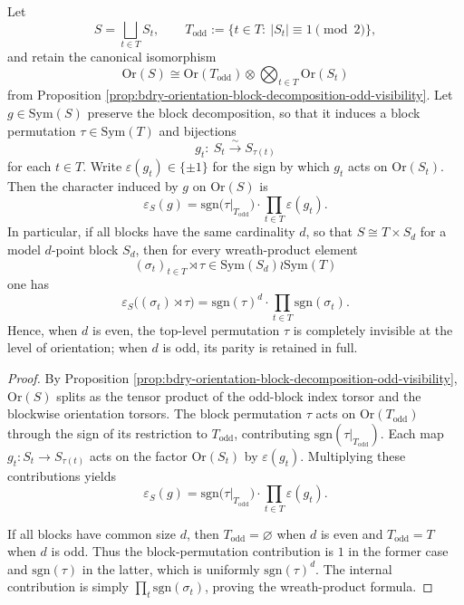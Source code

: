 \begin{theorem}\label{thm:bdry-orientation-wreath-character-odd-visibility}
Let
\[
S=\bigsqcup_{t\in T}S_t,
\qquad
T_{\mathrm{odd}}:=\{t\in T:\ |S_t|\equiv 1\pmod 2\},
\]
and retain the canonical isomorphism
\[
\mathrm{Or}(S)\cong \mathrm{Or}(T_{\mathrm{odd}})\otimes \bigotimes_{t\in T}\mathrm{Or}(S_t)
\]
from Proposition \ref{prop:bdry-orientation-block-decomposition-odd-visibility}.
Let \(g\in \mathrm{Sym}(S)\) preserve the block decomposition, so that it induces a block permutation \(\tau\in \mathrm{Sym}(T)\) and bijections
\[
g_t:\ S_t\xrightarrow{\sim} S_{\tau(t)}
\]
for each \(t\in T\).
Write \(\varepsilon(g_t)\in\{\pm 1\}\) for the sign by which \(g_t\) acts on \(\mathrm{Or}(S_t)\).
Then the character induced by \(g\) on \(\mathrm{Or}(S)\) is
\[
\varepsilon_S(g)
=
\mathrm{sgn}\!\bigl(\tau|_{T_{\mathrm{odd}}}\bigr)\cdot
\prod_{t\in T}\varepsilon(g_t).
\]
In particular, if all blocks have the same cardinality \(d\), so that \(S\cong T\times S_d\) for a model \(d\)-point block \(S_d\), then for every wreath-product element
\[
(\sigma_t)_{t\in T}\rtimes \tau\in \mathrm{Sym}(S_d)\wr \mathrm{Sym}(T)
\]
one has
\[
\varepsilon_S\bigl((\sigma_t)\rtimes \tau\bigr)
=
\mathrm{sgn}(\tau)^d\cdot \prod_{t\in T}\mathrm{sgn}(\sigma_t).
\]
Hence, when \(d\) is even, the top-level permutation \(\tau\) is completely invisible at the level of orientation; when \(d\) is odd, its parity is retained in full.
\end{theorem}

\begin{proof}
By Proposition \ref{prop:bdry-orientation-block-decomposition-odd-visibility}, \(\mathrm{Or}(S)\) splits as the tensor product of the odd-block index torsor and the blockwise orientation torsors.
The block permutation \(\tau\) acts on \(\mathrm{Or}(T_{\mathrm{odd}})\) through the sign of its restriction to \(T_{\mathrm{odd}}\), contributing
\(
\mathrm{sgn}(\tau|_{T_{\mathrm{odd}}})
\).
Each map \(g_t:S_t\to S_{\tau(t)}\) acts on the factor \(\mathrm{Or}(S_t)\) by \(\varepsilon(g_t)\).
Multiplying these contributions yields
\[
\varepsilon_S(g)
=
\mathrm{sgn}\!\bigl(\tau|_{T_{\mathrm{odd}}}\bigr)\cdot
\prod_{t\in T}\varepsilon(g_t).
\]
\par
If all blocks have common size \(d\), then \(T_{\mathrm{odd}}=\varnothing\) when \(d\) is even and \(T_{\mathrm{odd}}=T\) when \(d\) is odd.
Thus the block-permutation contribution is \(1\) in the former case and \(\mathrm{sgn}(\tau)\) in the latter, which is uniformly \(\mathrm{sgn}(\tau)^d\).
The internal contribution is simply \(\prod_t\mathrm{sgn}(\sigma_t)\), proving the wreath-product formula. \qedhere
\end{proof}

